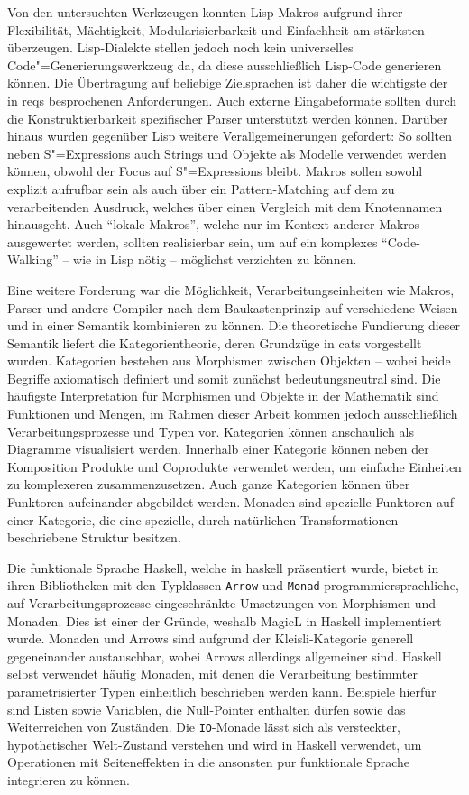 \documentclass[11pt, a4paper, bibgerm]{scrbook}
\newcommand\icode[1]{\lstinline?#1?}
\newcommand\cref{}
\newcommand{\sexps}{S"=Expressions}
\newcommand{\cgen}{Code"=Generierung}
\begin{document}
Von den untersuchten Werkzeugen konnten Lisp-Makros aufgrund ihrer
Flexibilität, Mächtigkeit, Modularisierbarkeit und Einfachheit am
stärksten überzeugen. Lisp-Dialekte stellen jedoch noch kein
universelles \cgen{}swerkzeug da, da diese ausschließlich Lisp-Code
generieren können. Die Übertragung auf beliebige Zielsprachen ist daher
die wichtigste der in \cref{reqs} besprochenen Anforderungen. Auch
externe Eingabeformate sollten durch die Konstruktierbarkeit
spezifischer Parser unterstützt werden können. Darüber hinaus wurden
gegenüber Lisp weitere Verallgemeinerungen gefordert: So sollten neben
\sexps{} auch Strings und Objekte als Modelle verwendet werden können,
obwohl der Focus auf \sexps{} bleibt. Makros sollen sowohl explizit
aufrufbar sein als auch über ein Pattern-Matching auf dem zu
verarbeitenden Ausdruck, welches über einen Vergleich mit dem
Knotennamen hinausgeht. Auch ``lokale Makros'', welche nur im Kontext
anderer Makros ausgewertet werden, sollten realisierbar sein, um auf ein
komplexes ``Code-Walking'' -- wie in Lisp nötig -- möglichst verzichten zu
können.

Eine weitere Forderung war die Möglichkeit, Verarbeitungseinheiten wie
Makros, Parser und andere Compiler nach dem Baukastenprinzip auf
verschiedene Weisen und in einer Semantik kombinieren zu können. Die
theoretische Fundierung dieser Semantik liefert die Kategorientheorie,
deren Grundzüge in \cref{cats} vorgestellt wurden. Kategorien bestehen
aus Morphismen zwischen Objekten -- wobei beide Begriffe axiomatisch
definiert und somit zunächst bedeutungsneutral sind. Die häufigste
Interpretation für Morphismen und Objekte in der Mathematik sind
Funktionen und Mengen, im Rahmen dieser Arbeit kommen jedoch
ausschließlich Verarbeitungsprozesse und Typen vor. Kategorien können
anschaulich als Diagramme visualisiert werden. Innerhalb einer Kategorie
können neben der Komposition Produkte und Coprodukte verwendet werden,
um einfache Einheiten zu komplexeren zusammenzusetzen. Auch ganze
Kategorien können über Funktoren aufeinander abgebildet werden. Monaden
sind spezielle Funktoren auf einer Kategorie, die eine spezielle, durch
natürlichen Transformationen beschriebene Struktur besitzen.

Die funktionale Sprache Haskell, welche in \cref{haskell} präsentiert
wurde, bietet in ihren Bibliotheken mit den Typklassen \icode{Arrow} und
\icode{Monad} programmiersprachliche, auf Verarbeitungsprozesse
eingeschränkte Umsetzungen von Morphismen und Monaden. Dies ist einer
der Gründe, weshalb MagicL in Haskell implementiert wurde. Monaden und
Arrows sind aufgrund der Kleisli-Kategorie generell gegeneinander
austauschbar, wobei Arrows allerdings allgemeiner sind. Haskell selbst
verwendet häufig Monaden, mit denen die Verarbeitung bestimmter
parametrisierter Typen einheitlich beschrieben werden kann. Beispiele
hierfür sind Listen sowie Variablen, die Null-Pointer enthalten dürfen
sowie das Weiterreichen von Zuständen. Die \icode{IO}-Monade lässt sich
als versteckter, hypothetischer Welt-Zustand verstehen und wird in
Haskell verwendet, um Operationen mit Seiteneffekten in die ansonsten
pur funktionale Sprache integrieren zu können.
\end{document}
